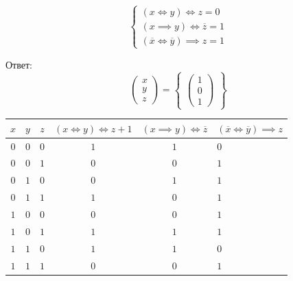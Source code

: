\documentclass[12pt,a4paper]{article}
\theoremstyle{plain}
\theoremstyle{definition}
\theoremstyle{remark}
\numberwithin{equation}{section}
\begin{document}
\subsection{}
  \begin{equation*}
    \begin{cases}
      (x \iff y) \iff z = 0 \\
      (x \implies y) \iff \overline z = 1 \\
      (\overline x \iff \overline y) \implies z = 1
    \end{cases}
  \end{equation*}

  \noindent Ответ:
  \begin{equation*}
  \left(\begin{matrix}
  x \\
  y \\
  z
  \end{matrix}\right) =
  \left\{
  \begin{matrix}
  \left(\begin{matrix}
  1 \\
  0 \\
  1
  \end{matrix}\right)
  \end{matrix}
  \right\}
  \end{equation*}

  \vspace{0.5em}

  \noindent\begin{tabularx}{\textwidth}{|c|c|c|c|c|X|}
    \hline
    $x$ & $y$ & $z$ & $(x \iff y) \iff z + 1$ & $(x \implies y) \iff \overline z$ & $(\overline x \iff \overline y) \implies z$ \\
    \hline
    $0$ & $0$ & $0$ & $1$ & $1$ & $0$ \\
    $0$ & $0$ & $1$ & $0$ & $0$ & $1$ \\
    $0$ & $1$ & $0$ & $0$ & $1$ & $1$ \\
    $0$ & $1$ & $1$ & $1$ & $0$ & $1$ \\
    $1$ & $0$ & $0$ & $0$ & $0$ & $1$ \\
    $1$ & $0$ & $1$ & $1$ & $1$ & $1$ \\
    $1$ & $1$ & $0$ & $1$ & $1$ & $0$ \\
    $1$ & $1$ & $1$ & $0$ & $0$ & $1$ \\
    \hline
  \end{tabularx}
\end{document}
